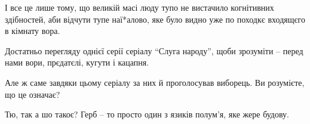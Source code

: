 І все це лише тому, що великій масі люду тупо не вистачило когнітивних
здібностей, аби відчути тупе наї*алово, яке було видно уже по походкє входящєго
в кімнату вора.

Достатньо перегляду однієї серії серіалу \enquote{Слуга народу}, щоби зрозуміти – перед
нами вори, прєдатєлі, кугути і кацапня.

Але ж саме завдяки цьому серіалу за них й проголосував виборець. Ви розумієте,
що це означає?

Тю, так а шо такоє? Герб – то просто один з язиків полум'я, яке жере будову.

